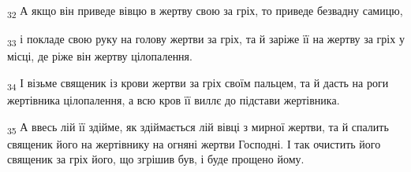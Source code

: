 \begin{tcolorbox}
\textsubscript{32} А якщо він приведе вівцю в жертву свою за гріх, то приведе безвадну самицю,
\end{tcolorbox}
\begin{tcolorbox}
\textsubscript{33} і покладе свою руку на голову жертви за гріх, та й заріже її на жертву за гріх у місці, де ріже він жертву цілопалення.
\end{tcolorbox}
\begin{tcolorbox}
\textsubscript{34} І візьме священик із крови жертви за гріх своїм пальцем, та й дасть на роги жертівника цілопалення, а всю кров її виллє до підстави жертівника.
\end{tcolorbox}
\begin{tcolorbox}
\textsubscript{35} А ввесь лій її здійме, як здіймається лій вівці з мирної жертви, та й спалить священик його на жертівнику на огняні жертви Господні. І так очистить його священик за гріх його, що згрішив був, і буде прощено йому.
\end{tcolorbox}
